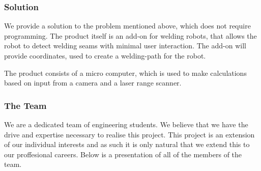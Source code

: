 \subsubsection{Solution}
We provide a solution to the problem mentioned above, which does not require programming. The product itself is an add-on for welding robots, that allows the robot to detect welding seams with minimal user interaction. The add-on will provide coordinates, used to create a welding-path for the robot. 

The product consists of a micro computer, which is used to make calculations based on input from a camera and a laser range scanner. 

\subsubsection{The Team}
We are a dedicated team of engineering students. We believe that we have the drive and expertise necessary to realise this project. This project is an extension of our individual interests and as such it is only natural that we extend this to our proffesional careers. Below is a presentation of all of the members of the team.


